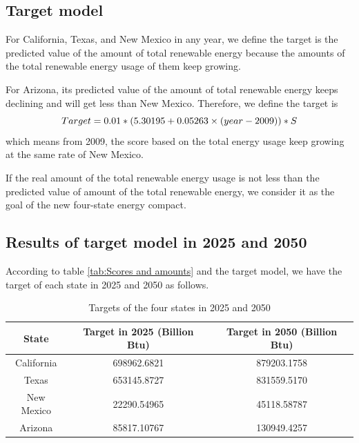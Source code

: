 \documentclass[a4paper,11pt]{article}
\begin{document}
\subsection{Target model}
\par For California, Texas, and New Mexico in any year, we define the target is the predicted value of the amount of total renewable energy because the amounts of the total renewable energy usage of them keep growing.
\par For Arizona, its predicted value of the amount of total renewable energy keeps declining and will get less than New Mexico. Therefore, we define the target is
\begin{equation}
    \centering
    Target=0.01*(5.30195+0.05263 \times (year-2009))*S
\end{equation}
which means from 2009, the score based on the total energy usage keep growing at the same rate of New Mexico.
\par If the real amount of the total renewable energy usage is not less than the predicted value of amount of the total renewable energy, we consider it as the goal of the new four-state energy compact.
\subsection{Results of target model in 2025 and 2050}
\par According to table \ref{tab:Scores and amounts} and the target model, we have the target of each state in 2025 and 2050 as follows.
\begin{table}[H]
    \centering 
    \begin{tabular}{|c|c|c|}
\hline
State & Target in 2025 (Billion Btu) & Target in 2050 (Billion Btu)\\
\hline
California & 698962.6821 & 879203.1758 \\
\hline
Texas & 653145.8727 & 831559.5170 \\
\hline
New Mexico & 22290.54965 & 45118.58787 \\
\hline
Arizona & 85817.10767 & 130949.4257 \\
\hline
\end{tabular}
\caption{Targets of the four states in 2025 and 2050}
\end{table}
\end{document}

